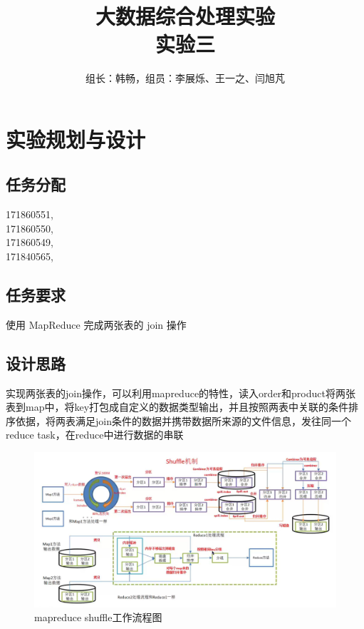 \documentclass[a4paper,UTF8]{article}
\author{组长：韩畅，组员：李展烁、王一之、闫旭芃}
\numberwithin{equation}{section}
\begin{document}
{}
\title{大数据综合处理实验\\
实验三}
\maketitle

\section{实验规划与设计}
\subsection{任务分配}
{171860551, }\\ \indent
{171860550, }\\ \indent
{171860549, }\\ \indent
{171840565, }
\subsection{任务要求}
使用 MapReduce 完成两张表的 join 操作
\subsection{设计思路}
实现两张表的join操作，可以利用mapreduce的特性，读入order和product将两张表到map中，将key打包成自定义的数据类型输出，并且按照两表中关联的条件排序依据，将两表满足join条件的数据并携带数据所来源的文件信息，发往同一个reduce task，在reduce中进行数据的串联
\begin{figure}[H]
    \centering

    \includegraphics[width = 15cm]{shuffle.png}

    \caption{mapreduce shuffle工作流程图}
\end{figure}
\end{document}
